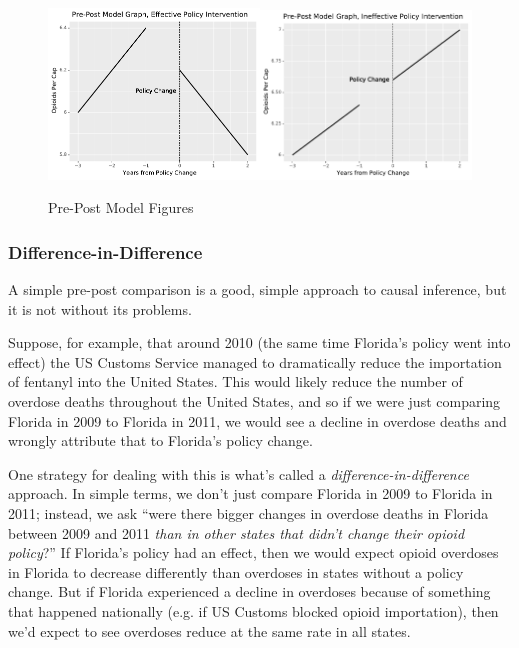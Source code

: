 \documentclass[12pt]{article}
\begin{document}
\begin{figure}[h!]
  \centering
  \caption{Pre-Post Model Figures}\label{figure_prepost_examples}
  \includegraphics[width=0.5\textwidth]{images/prepost_successful.pdf}\includegraphics[width=0.5\textwidth]{images/prepost_failed.pdf}
\end{figure}
\pagebreak
\subsubsection*{Difference-in-Difference}

A simple pre-post comparison is a good, simple approach to causal inference, but it is not without its problems.

Suppose, for example, that around 2010 (the same time Florida's policy went into effect) the US Customs Service managed to dramatically reduce the importation of fentanyl into the United States. This would likely reduce the number of overdose deaths throughout the United States, and so if we were just comparing Florida in 2009 to Florida in 2011, we would see a decline in overdose deaths and wrongly attribute that to Florida's policy change.

One strategy for dealing with this is what's called a \emph{difference-in-difference} approach. In simple terms, we don't just compare Florida in 2009 to Florida in 2011; instead, we ask ``were there bigger changes in overdose deaths in Florida between 2009 and 2011 \emph{than in other states that didn't change their opioid policy}?'' If Florida's policy had an effect, then we would expect opioid overdoses in Florida to decrease differently than overdoses in states without a policy change. But if Florida experienced a decline in overdoses because of something that happened nationally (e.g. if US Customs blocked opioid importation), then we'd expect to see overdoses reduce at the same rate in all states.
\end{document}
